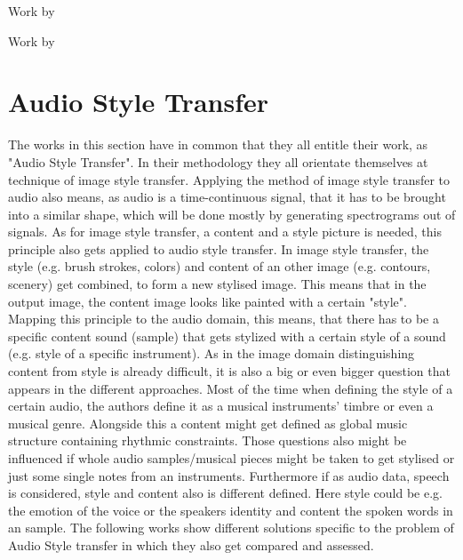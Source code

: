 Work by \cite{roche2019autoencoders}




Work by \cite{hantrakul2019fast}

\section{Audio Style Transfer}
\label{sec:rw_audio_style_transfer}
The works in this section have in common that they all entitle their work, as "Audio Style Transfer". In their methodology they all orientate themselves at technique of image style transfer. Applying the method of image style transfer to audio also means, as audio is a time-continuous signal, that it has to be brought into a similar shape, which will be done mostly by generating spectrograms out of signals. As for image style transfer, a content and a style picture is needed, this principle also gets applied to audio style transfer. In image style transfer, the style (e.g. brush strokes, colors) and content of an other image (e.g. contours, scenery) get combined, to form a new stylised image. \cite{Gatys2016} This means that in the output image, the content image looks like painted with a certain "style". Mapping this principle to the audio domain, this means, that there has to be a specific content sound (sample) that gets stylized with a certain style of a sound (e.g. style of a specific instrument). As in the image domain distinguishing content from style is already difficult, it is also a big or even bigger question that appears in the different approaches. Most of the time when defining the style of a certain audio, the authors define it as a musical instruments' timbre or even a musical genre. Alongside this a content might get defined as global music structure containing rhythmic constraints. \cite{Grinstein2018} Those questions also might be influenced if whole audio samples/musical pieces might be taken to get stylised or just some single notes from an instruments. Furthermore if as audio data, speech is considered, style and content also is different defined. Here style could be e.g. the emotion of the voice or the speakers identity and content the spoken words in an sample. The following works show different solutions specific to the problem of Audio Style transfer in which they also get compared and assessed. \\

